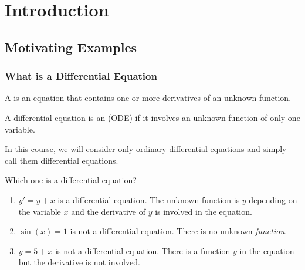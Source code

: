\chapter{Introduction}

\section{Motivating Examples}
\subsection{What is a Differential Equation}

\begin{definition}{}{}
  A  is an equation that contains one or more derivatives of an unknown function.

  A differential equation is an  (ODE) if it involves an unknown function of only one variable.
\end{definition}

In this course, we will consider only ordinary differential equations and simply call them differential equations.

\begin{example} Which one is a differential equation?
  \begin{enumerate}
    \item $y' = y + x$ is a differential equation. The unknown function is $y$ depending on the variable $x$ and the derivative of $y$ is involved in the equation.
    \item $\sin (x) =1$ is not a differential equation. There is no unknown \emph{function}.
    \item $y= 5 + x$ is not a differential equation. There is a function $y$ in the equation but the derivative is not involved.
  \end{enumerate}
\end{example}

